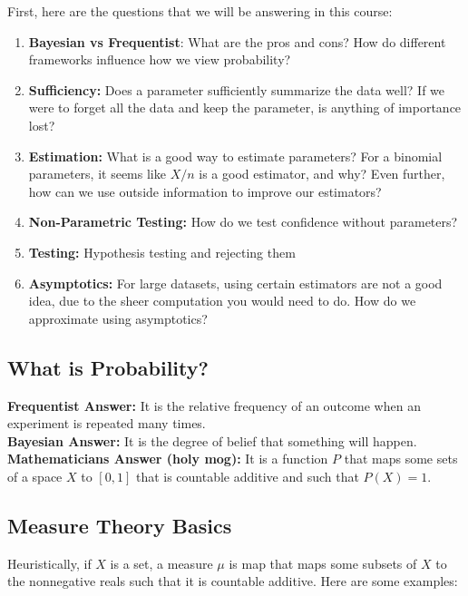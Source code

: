 
First, here are the questions that we will be answering in this course:
\begin{enumerate}
    \item \textbf{Bayesian vs Frequentist}: What are the pros and cons? How do different frameworks influence how we view probability?
    \item \textbf{Sufficiency:} Does a parameter sufficiently summarize the data well? If we were to forget all the data and keep the parameter, is anything of importance lost?
    \item \textbf{Estimation:} What is a good way to estimate parameters? For a binomial parameters, it seems like $X/n$ is a good estimator, and why? Even further, how can we use outside information to improve our estimators?
    \item \textbf{Non-Parametric Testing:} How do we test confidence without parameters?
    \item \textbf{Testing:} Hypothesis testing and rejecting them
    \item \textbf{Asymptotics:} For large datasets, using certain estimators are not a good idea, due to the sheer computation you would need to do. How do we approximate using asymptotics?
\end{enumerate}

\subsection*{What is Probability?}
\sectionspace

\textbf{Frequentist Answer:} It is the relative frequency of an outcome when an experiment is repeated many times.\\

\textbf{Bayesian Answer:} It is the degree of belief that something will happen.\\

\textbf{Mathematicians Answer (holy mog):} It is a function $P$ that maps some sets of a space $X$ to $[0, 1]$ that is countable additive and such that $P(X) = 1$. 

\subsection*{Measure Theory Basics}
\sectionspace

Heuristically, if $X$ is a set, a measure $\mu$ is map that maps some subsets of $X$ to the nonnegative reals such that it is countable additive. Here are some examples:\\

